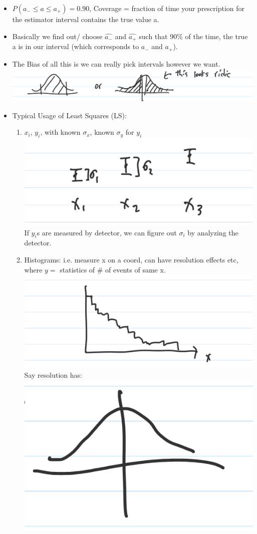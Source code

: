 \begin{itemize}
    \item $P(a_{-} \leq a \leq a_{+}) = 0.90$, Coverage = fraction of time your prescription for the estimator interval contains the true value a.
    \item Basically we find out/ choose $\hat{a_{-}}$ and $\hat{a_{+}}$ such that 90\% of the time, the true a is in our interval (which corresponds to $a_{-}$ and $a_{+}$).
    \item The Bias of all this is we can really pick intervals however we want.\\
          \includegraphics[width = 0.6\linewidth]{Images/lec11-biased-intervals.png}\\
          \divider
    \item Typical Usage of Least Squares (LS):
          \begin{enumerate}
              \item $x_i$, $y_i$, with known $\sigma_{x}$, known $\sigma_{y}$ for $y_i$ \\
                    \includegraphics[width = 0.4 \linewidth]{Images/lec11-points.png} \\
                    If $y_{i}$s are measured by detector, we can figure out $\sigma_{i}$ by analyzing the detector. \\
              \item Histograms: i.e. measure x on a coord, can have resolution effects etc, where $y = $ statistics of \# of events of same x. \\
                    \includegraphics[width = 0.4 \linewidth]{Images/lec11-histogram.png}\\
                    Say resolution has: \\
                    \includegraphics[width = 0.4 \linewidth]{Images/lec11-resolution.png}\\

\end{enumerate}
\end{itemize}
